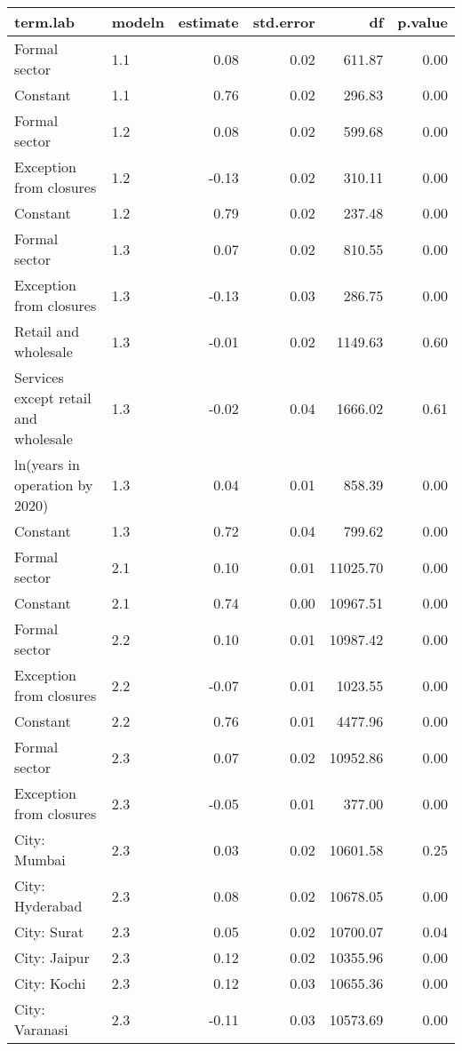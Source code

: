 \begin{longtable}{llrrrr}
  \hline
term.lab & modeln & estimate & std.error & df & p.value \\ 
  \hline
Formal sector & 1.1 & 0.08 & 0.02 & 611.87 & 0.00 \\ 
  Constant & 1.1 & 0.76 & 0.02 & 296.83 & 0.00 \\ 
  Formal sector & 1.2 & 0.08 & 0.02 & 599.68 & 0.00 \\ 
  Exception from closures & 1.2 & -0.13 & 0.02 & 310.11 & 0.00 \\ 
  Constant & 1.2 & 0.79 & 0.02 & 237.48 & 0.00 \\ 
  Formal sector & 1.3 & 0.07 & 0.02 & 810.55 & 0.00 \\ 
  Exception from closures & 1.3 & -0.13 & 0.03 & 286.75 & 0.00 \\ 
  Retail and wholesale & 1.3 & -0.01 & 0.02 & 1149.63 & 0.60 \\ 
  Services except retail and wholesale & 1.3 & -0.02 & 0.04 & 1666.02 & 0.61 \\ 
  ln(years in operation by 2020) & 1.3 & 0.04 & 0.01 & 858.39 & 0.00 \\ 
  Constant & 1.3 & 0.72 & 0.04 & 799.62 & 0.00 \\ 
  Formal sector & 2.1 & 0.10 & 0.01 & 11025.70 & 0.00 \\ 
  Constant & 2.1 & 0.74 & 0.00 & 10967.51 & 0.00 \\ 
  Formal sector & 2.2 & 0.10 & 0.01 & 10987.42 & 0.00 \\ 
  Exception from closures & 2.2 & -0.07 & 0.01 & 1023.55 & 0.00 \\ 
  Constant & 2.2 & 0.76 & 0.01 & 4477.96 & 0.00 \\ 
  Formal sector & 2.3 & 0.07 & 0.02 & 10952.86 & 0.00 \\ 
  Exception from closures & 2.3 & -0.05 & 0.01 & 377.00 & 0.00 \\ 
  City: Mumbai & 2.3 & 0.03 & 0.02 & 10601.58 & 0.25 \\ 
  City: Hyderabad & 2.3 & 0.08 & 0.02 & 10678.05 & 0.00 \\ 
  City: Surat & 2.3 & 0.05 & 0.02 & 10700.07 & 0.04 \\ 
  City: Jaipur & 2.3 & 0.12 & 0.02 & 10355.96 & 0.00 \\ 
  City: Kochi & 2.3 & 0.12 & 0.03 & 10655.36 & 0.00 \\ 
  City: Varanasi & 2.3 & -0.11 & 0.03 & 10573.69 & 0.00 \\ 

\end{longtable}
